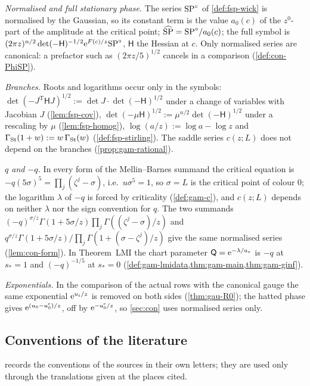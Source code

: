 \emph{Normalised and full stationary phase.} The series $\mathrm{SP}^{\circ}$ of \cref{def:fsp-wick} is normalised by the Gaussian, so its constant term is the value $a_0(c)$ of the $z^0$-part of the amplitude at the critical point; $\widehat{\mathrm{SP}}=\mathrm{SP}^{\circ}/a_0(c)$; the full symbol is $(2\pi z)^{n/2}\det(-\mathsf H)^{-1/2}\mathrm{e}^{F(c)/z}\mathrm{SP}^{\circ}$, $\mathsf H$ the Hessian at $c$. Only normalised series are canonical: a prefactor such as $(2\pi z/5)^{1/2}$ cancels in a comparison (\cref{def:con-PhiSP}).

\emph{Branches.} Roots and logarithms occur only in the symbols: $\det(-J^{\mathrm T}\mathsf HJ)^{1/2}:=\det J\cdot\det(-\mathsf H)^{1/2}$ under a change of variables with Jacobian $J$ (\cref{lem:fsp-cov}), $\det(-\mu\mathsf H)^{1/2}:=\mu^{n/2}\det(-\mathsf H)^{1/2}$ under a rescaling by $\mu$ (\cref{lem:fsp-homog}), $\log(a/z):=\log a-\log z$ and $\Gamma_{\mathrm{St}}(1+w):=w\,\Gamma_{\mathrm{St}}(w)$ (\cref{def:fsp-stirling}). The saddle series $c(z;L)$ does not depend on the branches (\cref{prop:gam-rational}).

\emph{$q$ and $-q$.} In every form of the Mellin--Barnes summand the critical equation is $-q(5\sigma)^5=\prod_j(\zeta^j-\sigma)$, i.e.\ $u\sigma^5=1$, so $\sigma=L$ is the critical point of colour $0$; the logarithm $\lambda$ of $-q$ is forced by criticality (\cref{def:gam-c}), and $c(z;L)$ depends on neither $\lambda$ nor the sign convention for $q$. The two summands $(-q)^{\sigma/z}\Gamma(1+5\sigma/z)\prod_j\Gamma((\zeta^j-\sigma)/z)$ and $q^{\sigma/z}\Gamma(1+5\sigma/z)/\prod_j\Gamma(1+(\sigma-\zeta^j)/z)$ give the same normalised series (\cref{lem:con-form}). In Theorem~LMI the chart parameter $\mathsf Q=\mathrm{e}^{-\lambda/a_*}$ is $-q$ at $s_*=1$ and $(-q)^{-1/5}$ at $s_*=0$ (\cref{def:gam-lmidata,thm:gam-main,thm:gam-ginf}).

\emph{Exponentials.} In the comparison of the actual rows with the canonical gauge the same exponential $\mathrm{e}^{u_i/z}$ is removed on both sides (\cref{thm:gau-R0}); the hatted phase gives $\mathrm{e}^{(u_0-u_0^{\mathrm c})/z}$, off by $\mathrm{e}^{-u_0^{\mathrm c}/z}$, so \cref{sec:con} uses normalised series only.

\subsection{Conventions of the literature}
\label{sec:sgn-lit}

 records the conventions of the sources in their own letters; they are used only through the translations given at the places cited.

